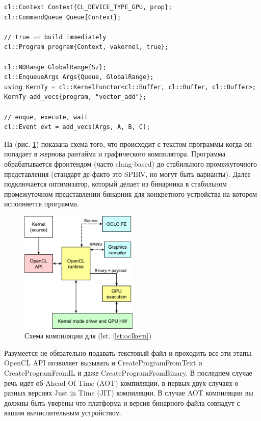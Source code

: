 \documentclass[a4paper,12pt,oneside]{article}
\begin{document}
\begin{lstlisting}[caption={Создание кернела, OpenCL},label={lst:oclkern}]
cl::Context Context{CL_DEVICE_TYPE_GPU, prop};
cl::CommandQueue Queue{Context};

// true == build immediately
cl::Program program{Context, vakernel, true};

cl::NDRange GlobalRange{Sz};
cl::EnqueueArgs Args{Queue, GlobalRange};
using KernTy = cl::KernelFunctor<cl::Buffer, cl::Buffer, cl::Buffer>;
KernTy add_vecs{program, "vector_add"};

// enque, execute, wait
cl::Event evt = add_vecs(Args, A, B, C);
\end{lstlisting}

На (рис. \ref{fig:oclkern}) показана схема того, что происходит с текстом программы когда он попадает в жернова рантайма и графического компилятора.
Программа обрабатывается фронтендом (часто clang-based) до стабильного промежуточного представления (стандарт де-факто это SPIRV, но могут быть варианты).
Далее подключается оптимизатор, который делает из бинарника в стабильном промежуточном представлении бинарник для конкретного устройства на котором исполняется программа.

\begin{figure}
\centering
\includegraphics[width=0.5\textwidth]{pictures/ocl-compilation-scheme.pdf}
\caption{Схема компиляции для (lst. \ref{lst:oclkern})}
\label{fig:oclkern}
\end{figure}

Разумеется не обязательно подавать текстовый файл и проходить все эти этапы.
OpenCL API позволяет вызывать и CreateProgramFromText и CreateProgramFromIL и даже CreateProgramFromBinary.
В последнем случае речь идёт об Ahead Of Time (AOT) компиляции, в первых двух случаях о разных версиях Just in Time (JIT) компиляции.
В случае AOT компиляции вы должны быть уверены что платформа и версия бинарного файла совпадут с вашим вычислительным устройством.
\end{document}
